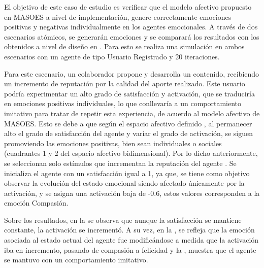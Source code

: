 \clearpage
\newpage


El objetivo de este caso de estudio es verificar que el modelo afectivo propuesto en
MASOES a nivel de implementación, genere correctamente emociones positivas y negativas
individualmente en los agentes emocionales. A través de dos escenarios atómicos,
se generarán emociones y se comparará los resultados con los obtenidos
a nivel de diseño en \cite{perozo2012}.
Para esto se realiza una simulación en ambos escenarios con un agente de tipo Usuario Registrado
y 20 iteraciones.


Para este escenario, un colaborador propone y desarrolla un contenido, recibiendo
un incremento de reputación por la calidad del aporte realizado. Este usuario
podría experimentar un alto grado de satisfacción y activación, que se
traduciría en emociones positivas individuales, lo que conllevaría a un
comportamiento imitativo para tratar de repetir esta experiencia,
de acuerdo al modelo afectivo de MASOES. Esto se debe a que según el espacio afectivo definido
, al permanecer alto el grado de satisfacción
del agente y variar el grado de activación, se siguen promoviendo las emociones
positivas, bien sean individuales o sociales (cuadrantes 1 y 2 del espacio
afectivo bidimensional). Por lo dicho anteriormente, se seleccionan
solo estímulos que incrementan la reputación del agente .
Se inicializa el agente con un satisfacción igual a 1, ya que, se tiene como objetivo observar la evolución del estado emocional
siendo afectado únicamente por la activación, y se asigna una activación baja de -0.6,
estos valores corresponden a la emoción Compasión.

Sobre los resultados, en la  se observa que
aunque la satisfacción se mantiene constante, la activación se incrementó.
A su vez,
en la , se refleja que
la emoción asociada al estado actual del agente fue modificándose a medida que la activación iba
en incremento, pasando de compasión a felicidad y la ,
muestra que el agente se mantuvo con un comportamiento imitativo.

